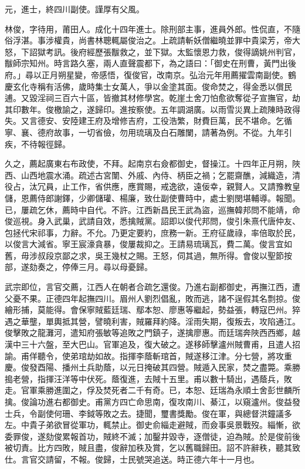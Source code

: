 \begin{pinyinscope}
元，進士，終四川副使。謹厚有父風。

林俊，字待用，莆田人。成化十四年進士。除刑部主事，進員外郎。性侃直，不隨俗浮湛。事涉權貴，尚書林聰輒屬俊治之。上疏請斬妖僧繼曉並罪中貴梁芳，帝大怒，下詔獄考訊。後府經歷張黻救之，並下獄。太監懷恩力救，俊得謫姚州判官，黻師宗知州。時言路久塞，兩人直聲震都下，為之語曰：「御史在刑曹，黃門出後府。」尋以正月朔星變，帝感悟，復俊官，改南京。弘治元年用薦擢雲南副使。鶴慶玄化寺稱有活佛，歲時集士女萬人，爭以金塗其面。俊命焚之，得金悉以償民逋。又毀淫祠三百六十區，皆撤其材修學宮。乾崖土舍刀怕愈欲奪從子宣撫官，劫其印數年。俊檄諭之，遂歸印。進按察使。五年調湖廣。以雨雪災異上疏陳時政得失。又言德安、安陸建王府及增修吉府，工役浩繁，財費巨萬，民不堪命。乞循寧、襄、德府故事，一切省儉，勿用琉璃及白石雕闌，請著為例。不從。九年引疾，不待報徑歸。

久之，薦起廣東右布政使，不拜。起南京右僉都御史，督操江。十四年正月朔，陜西、山西地震水涌。疏述古宮闈、外戚、內侍、柄臣之禍；乞罷齋醮，減織造，清役占，汰冗員，止工作，省供應，應賞賜，戒逸欲，遠佞幸，親賢人。又請豫教皇儲，恩薦侍郎謝鐸，少卿儲瓘、楊廉，致仕副使曹時中，處士劉閔堪輔導。報聞。已，屢疏乞休，薦時中自代。不許。江西新昌民王武為盜，巡撫韓邦問不能靖，命俊巡視。身入武巢，武請自效，悉擒賊黨。詔即以俊代邦問，俊引朱熹代唐仲友、包拯代宋祁事，力辭。不允。乃更定要約，庶務一新。王府征歲祿，率倍取於民，以俊言大減省。寧王宸濠貪暴，俊屢裁抑之。王請易琉璃瓦，費二萬。俊言宜如舊，毋涉叔段京鄙之求，吳王幾杖之賜。王怒，伺其過，無所得。會俊以聖節按部，遂劾奏之，停俸三月。尋以母憂歸。

武宗即位，言官交薦，江西人在朝者合疏乞還俊。乃進右副都御史，再撫江西，遭父憂不果。正德四年起撫四川。眉州人劉烈倡亂，敗而逃，諸不逞假其名剽掠。俊繪形捕，莫能得。會保寧賊藍廷瑞、鄢本恕、廖惠等繼起，勢益張，轉寇巴州。猝遇之華壟，單輿抵其營，譬曉利害，賊羅拜約降。淫雨失期，復叛去，攻陷通江。俊擊敗之龍灘河，遣知府張敏等追敗之門鎮子，遂擒廖惠。而廷瑞奔陜西西鄉，越漢中三十六盤，至大巴山。官軍追及，復大破之。遂移師擊瀘州賊曹甫，且遣人招諭。甫佯聽令，使弟琯劫如故。指揮李蔭斬琯首，賊遂移江津。分七營，將攻重慶。俊發酉陽、播州土兵助蔭，以元日掩破其四營。賊遁入民家，焚之盡斃。乘勝搗老營，指揮汪洋等中伏死。蔭復進，去賊十五里。甫以數十騎出，遇蔭兵，敗走。官軍乘勝進圍之，俘及焚死者二千有奇。已，本恕、廷瑞為永順土舍彭世麟所擒。俊論功進右都御史。甫黨方四亡命思南，復攻南川、綦江，以窺瀘州。俊益發士兵，令副使何珊、李鉞等敗之去。捷聞，璽書獎勵。俊在軍，與總督洪鐘議多左。中貴子弟欲冒從軍功，輒禁止。御史俞緇走避賊，而僉事吳景戰歿。緇慚，欲委罪俊，遂劾俊累報首功，賊終不滅；加鑿井毀寺，逐僧徒，迫為賊。於是俊前後被切責。比方四敗，賊且盡，俊辭加秩及賞，乞以舊職歸田。詔不許辭秩，聽其致仕。言官交請留，不報。俊歸，士民號哭追送。時正德六年十一月也。


\end{pinyinscope}
